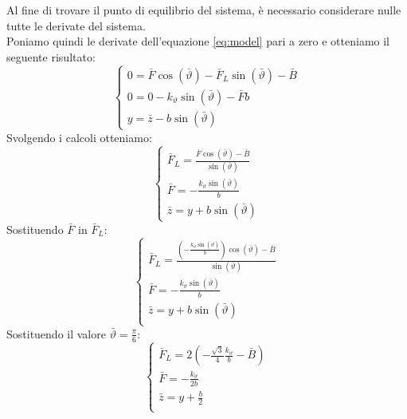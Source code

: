Al fine di trovare il punto di equilibrio del sistema, è necessario considerare nulle tutte le derivate del sistema.\\
Poniamo quindi le derivate dell'equazione \eqref{eq:model} pari a zero e otteniamo il seguente risultato:
\begin{displaymath}
\left\{
\begin{array}{l}
0=\bar F \cos (\bar\vartheta)-\bar F_L \operatorname{sin}(\bar\vartheta)-\bar B \\
0=0-k_{\vartheta} \operatorname{sin}(\bar\vartheta)-\bar{F} b \\
y=\bar{z}-b \operatorname{sin}(\bar\vartheta)
\end{array}
\right.
\end{displaymath}
Svolgendo i calcoli otteniamo:
\begin{displaymath}
\left\{
\begin{array}{l}
\bar F_L= \frac{\bar F \cos(\bar\vartheta)-\bar B}{\sin(\bar\vartheta)} \\
\bar F = -\frac{k_\vartheta \sin(\bar\vartheta)}{b} \\
\bar z = y + b\sin(\bar\vartheta)
\end{array}
\right.
\end{displaymath}
Sostituendo $\bar F$ in $\bar F_L$:
\begin{displaymath}
\left\{
\begin{array}{l}
\bar F_L= \frac{(-\frac{k_\vartheta \sin(\bar\vartheta)}{b}) \cos(\bar\vartheta)-\bar B}{\sin(\bar\vartheta)} \\
\bar F = -\frac{k_\vartheta \sin(\bar\vartheta)}{b} \\
\bar z = y + b\sin(\bar\vartheta) \\
\end{array}
\right.
\end{displaymath}
Sostituendo il valore $\bar\vartheta = \frac{\pi}{6}$:
\begin{displaymath}
\left\{
\begin{array}{l}
\bar F_L= 2(-\frac{\sqrt3}{4}\frac{k_\vartheta}{b}-\bar B)\\
\bar F = -\frac{k_\vartheta}{2b} \\
\bar z = y + \frac{b}{2} \\
\end{array}
\right.
\end{displaymath}